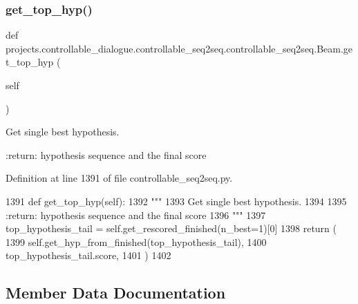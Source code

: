 \subsubsection{\texorpdfstring{get\+\_\+top\+\_\+hyp()}{get\_top\_hyp()}}
{\footnotesize\ttfamily def projects.\+controllable\+\_\+dialogue.\+controllable\+\_\+seq2seq.\+controllable\+\_\+seq2seq.\+Beam.\+get\+\_\+top\+\_\+hyp (\begin{DoxyParamCaption}\item[{}]{self }\end{DoxyParamCaption})}

\begin{DoxyVerb}Get single best hypothesis.

:return: hypothesis sequence and the final score
\end{DoxyVerb}
 

Definition at line 1391 of file controllable\+\_\+seq2seq.\+py.


\begin{DoxyCode}
1391     \textcolor{keyword}{def }get\_top\_hyp(self):
1392         \textcolor{stringliteral}{"""}
1393 \textcolor{stringliteral}{        Get single best hypothesis.}
1394 \textcolor{stringliteral}{}
1395 \textcolor{stringliteral}{        :return: hypothesis sequence and the final score}
1396 \textcolor{stringliteral}{        """}
1397         top\_hypothesis\_tail = self.get\_rescored\_finished(n\_best=1)[0]
1398         \textcolor{keywordflow}{return} (
1399             self.get\_hyp\_from\_finished(top\_hypothesis\_tail),
1400             top\_hypothesis\_tail.score,
1401         )
1402 
\end{DoxyCode}


\subsection{Member Data Documentation}
\mbox{\label{classprojects_1_1controllable__dialogue_1_1controllable__seq2seq_1_1controllable__seq2seq_1_1Beam_af5a49546e67604c1709af4769aab87ba}} 
